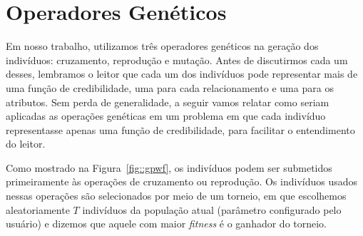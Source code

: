 

\section{Operadores Genéticos}
\label{subsec::operadoresgeneticos}

Em nosso trabalho, utilizamos três operadores genéticos na geração dos indivíduos: cruzamento, reprodução e mutação.
Antes de discutirmos cada um desses, lembramos o leitor que cada um dos indivíduos pode representar mais de uma função de credibilidade, uma para cada relacionamento e uma para os atributos. Sem perda de generalidade, a seguir vamos relatar como seriam aplicadas as operações genéticas em um problema em que cada indivíduo representasse apenas uma função de credibilidade, para facilitar o entendimento do leitor.

Como mostrado na Figura~\ref{fig::gpwf}, os indivíduos podem ser submetidos primeiramente às operações de cruzamento ou reprodução.
Os indivíduos usados nessas operações são selecionados por meio de um torneio, em que escolhemos aleatoriamente $T$ indivíduos da população atual (parâmetro configurado pelo usuário) e dizemos que aquele com maior \textit{fitness} é o ganhador do torneio.

